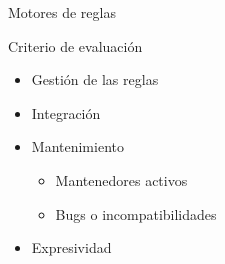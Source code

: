 \documentclass[10pt]{beamer}
\begin{document}
\begin{frame}{Motores de reglas}
    \begin{block}{Criterio de evaluación}
        \begin{itemize}
            \item Gestión de las reglas
            \item Integración
            \item Mantenimiento
            \begin{itemize}
                \item Mantenedores activos
                \item Bugs o incompatibilidades
            \end{itemize}
            \item Expresividad
        \end{itemize}    
    \end{block}
\end{frame}
\end{document}
